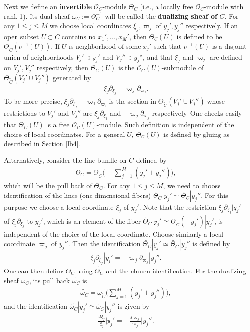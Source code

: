 \documentclass[12pt,b5paper,notitlepage]{report}
\theoremstyle{definition}
\theoremstyle{plain}
\newcommand{\wtd}{\widetilde}
\newcommand{\scr}{\mathscr}
\numberwithin{equation}{section}
\begin{document}
Next we define an \textbf{invertible} $\scr O_C$-module $\Theta_C$ (i.e., a locally free $\scr O_C$-module with rank 1).    Its dual sheaf $\omega_C:=\Theta_C^{-1}$ will be called the \textbf{dualizing sheaf of $C$}.  For any $1\leq j\leq M$ we choose local coordinates $\xi_j,\varpi_j$ of $y_j',y_j''$ respectively. If an open subset $U\subset C$ contains no $x_1',\dots,x_M'$, then $\Theta_C(U)$ is defined to be $\Theta_{\wtd C}(\nu^{-1}(U))$. If $U$ is  neighborhood of some $x_j'$ such that $\nu^{-1}(U)$ is a disjoint union of neighborhoods $V_j'\ni y_j'$ and $V_j''\ni y_j''$, and that $\xi_j$ and $\varpi_j$ are defined on $V_j',V_j''$ respectively,  then $\Theta_C(U)$ is the $\scr O_C(U)$-submodule of $\Theta_{\wtd C}(V_j'\cup V_j'')$ generated by
\begin{align}
\xi_j\partial_{\xi_j}-\varpi_j\partial_{\varpi_j}.\label{eq57}
\end{align}
To be more precise, $\xi_j\partial_{\xi_j}-\varpi_j\partial_{\varpi_j}$ is the section in $\Theta_{\wtd C}(V_j'\cup V_j'')$ whose restrictions to $V_j'$ and $V_j''$ are $\xi_j\partial_{\xi_j}$ and $-\varpi_j\partial_{\varpi_j}$ respectively. One checks easily that $\Theta_C(U)$ is a free $\scr O_C(U)$-module.  Such definition is independent of the choice of local coordinates. For a general $U$, $\Theta_C(U)$ is defined by gluing as described in Section \ref{lb4}.

Alternatively, consider the line bundle on $\wtd C$ defined by
\begin{align}
\wtd{\Theta_C}=\Theta_{\wtd C}\big(-\sum_{j=1}^M(y_j'+y_j'')\big),\label{eq14}
\end{align}
which will be the pull back of $\Theta_C$. For any $1\leq j\leq M$, we need to choose identification of the lines (one dimensional fibers) $\wtd{\Theta_C}|y_j'\simeq\wtd{\Theta_C}|y_j''$. For this purpose we choose a local coordinate $\xi_j$ of $y_j'$. Note that the restriction $\xi_j\partial_{\xi_j}|y_j'$ of $\xi_j\partial_{\xi_j}$ to $y_j'$, which is an element of the fiber $\wtd{\Theta_C}|y_j'\simeq\Theta_{\wtd C}(-y_j')|y_j'$, is independent of the choice of the local coordinate. Choose similarly a local coordinate $\varpi_j$ of $y_j''$. Then the identification $\wtd{\Theta_C}|y_j'\simeq\wtd{\Theta_C}|y_j''$ is defined by
\begin{align}
\xi_j\partial_{\xi_j}|y_j'= -\varpi_j\partial_{\varpi_j}|y_j''.
\end{align}
One can then define $\Theta_C$ using $\wtd{\Theta_C}$ and the chosen identification. For the dualizing sheaf $\omega_C$, its pull back $\wtd{\omega_C}$ is
\begin{align}
\wtd{\omega_C}=\omega_{\wtd C}\big(\sum_{j=1}^M(y_j'+y_j'')\big),\label{eq218}
\end{align}
and the identification $\wtd{\omega_C}|y_j'\simeq\wtd{\omega_C}|y_j''$ is given by
\begin{align}
\frac{d\xi_j}{\xi_j}\Big|y_j'=-\frac{d\varpi_j}{\varpi_j}\Big|y_j''.\label{eq159}
\end{align}
\end{document}
